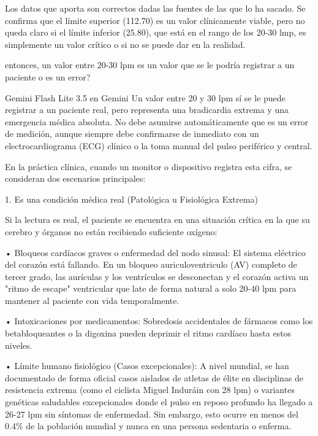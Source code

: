 \documentclass[12pt,a4paper,oneside]{book}
\begin{document}
\begin{iaanalisis}
Los datos que aporta son correctos dadas las fuentes de las que lo ha sacado. Se confirma que el límite superior (112.70) es un valor clínicamente viable, pero no queda claro si el límite inferior (25.80), que está en el rango de los 20-30 lmp, es simplemente un valor crítico o si no se puede dar en la realidad.
\end{iaanalisis}




\begin{iaprompt}
entonces, un valor entre 20-30 lpm es un valor que se le podría registrar a un paciente o es un error?
\end{iaprompt}
\begin{iaresp}{Gemini Flash Lite 3.5 en Gemini}
Un valor entre 20 y 30 lpm sí se le puede registrar a un paciente real, pero representa una bradicardia extrema y una emergencia médica absoluta. No debe asumirse automáticamente que es un error de medición, aunque siempre debe confirmarse de inmediato con un electrocardiograma (ECG) clínico o la toma manual del pulso periférico y central.

En la práctica clínica, cuando un monitor o dispositivo registra esta cifra, se consideran dos escenarios principales:

1. Es una condición médica real (Patológica u Fisiológica Extrema)

Si la lectura es real, el paciente se encuentra en una situación crítica en la que su cerebro y órganos no están recibiendo suficiente oxígeno:

• Bloqueos cardíacos graves o enfermedad del nodo sinusal: El sistema eléctrico del corazón está fallando. En un bloqueo auriculoventriculo (AV) completo de tercer grado, las aurículas y los ventrículos se desconectan y el corazón activa un "ritmo de escape" ventricular que late de forma natural a solo 20-40 lpm para mantener al paciente con vida temporalmente.

• Intoxicaciones por medicamentos: Sobredosis accidentales de fármacos como los betabloqueantes o la digoxina pueden deprimir el ritmo cardíaco hasta estos niveles.

• Límite humano fisiológico (Casos excepcionales): A nivel mundial, se han documentado de forma oficial casos aislados de atletas de élite en disciplinas de resistencia extrema (como el ciclista Miguel Induráin con 28 lpm) o variantes genéticas saludables excepcionales donde el pulso en reposo profundo ha llegado a 26-27 lpm sin síntomas de enfermedad. Sin embargo, esto ocurre en menos del 0.4\% de la población mundial y nunca en una persona sedentaria o enferma.


\end{iaresp}
\end{document}
